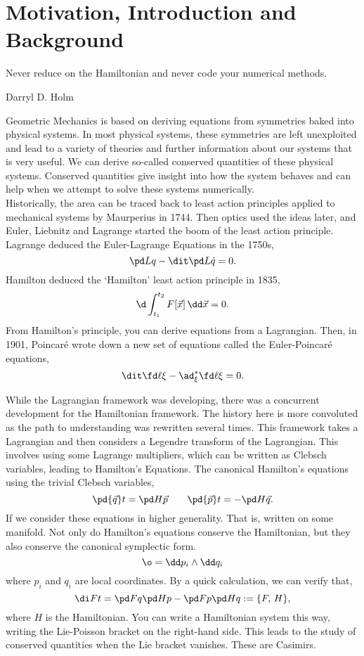 
\chapter{Motivation, Introduction and Background}
\epigraph{Never reduce on the Hamiltonian and never code your numerical methods.}{Darryl D. Holm}
\noindent
Geometric Mechanics is based on deriving equations from symmetries baked into physical systems. In most physical systems, these symmetries are left unexploited and lead to a variety of theories and further information about our systems that is very useful. We can derive so-called conserved quantities of these physical systems. Conserved quantities give insight into how the system behaves and can help when we attempt to solve these systems numerically. \\

\noindent
Historically, the area can be traced back to least action principles applied to mechanical systems by Maurperius in 1744. Then optics used the ideas later, and Euler, Liebnitz and Lagrange started the boom of the least action principle. Lagrange deduced the Euler-Lagrange Equations in the 1750s,
$$ \pd L q - \dit \pd L {\dot q} = 0. $$
Hamilton deduced the `Hamilton' least action principle in 1835,
$$ \d \int_{t_1}^{t_2} F[\vec x] \, \dd \vec x = 0. $$
From Hamilton's principle, you can derive equations from a Lagrangian. Then, in 1901, Poincar\'e wrote down a new set of equations called the Euler-Poincar\'e equations,
$$ \dit \fd \ell \xi - \ad^*_\xi \fd \ell \xi = 0. $$

\noindent
While the Lagrangian framework was developing, there was a concurrent development for the Hamiltonian framework. The history here is more convoluted as the path to understanding was rewritten several times. This framework takes a Lagrangian and then considers a Legendre transform of the Lagrangian. This involves using some Lagrange multipliers, which can be written as Clebsch variables, leading to Hamilton's Equations. The canonical Hamilton's equations using the trivial Clebsch variables,
$$ \pd {\vec q} t = \pd H {\vec p} \qquad \pd {\vec p} t = -\pd H {\vec q}. $$
If we consider these equations in higher generality. That is, written on some manifold. Not only do Hamilton's equations conserve the Hamiltonian, but they also conserve the canonical symplectic form.
$$ \o = \dd p_i \wedge \dd q_i $$
where $p_i$ and $q_i$ are local coordinates. By a quick calculation, we can verify that,
$$ \di F t = \pd F q \pd H p - \pd F p \pd H q := \{F,\, H\}, $$
where $H$ is the Hamiltonian. You can write a Hamiltonian system this way, writing the Lie-Poisson bracket on the right-hand side. This leads to the study of conserved quantities when the Lie bracket vanishes. These are Casimirs.

